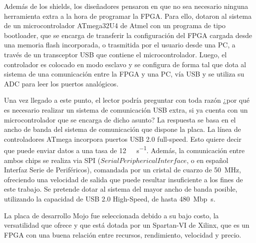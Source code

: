 Además de los shields, los diseñadores pensaron en que no sea necesario ninguna herramienta extra a la hora de programar la FPGA. Para ello, dotaron al sistema de un microcontrolador ATmega32U4 de Atmel con un programa de tipo bootloader, que se encarga de transferir la configuración del FPGA cargada desde una memoria flash incorporada, o trasmitida por el usuario desde una PC, a través de un transceptor USB que contiene el microcontrolador. Luego, el controlador es colocado en modo esclavo y se configura de forma tal que dota al sistema de una comunicación entre la FPGA y una PC, vía USB y se utiliza su ADC para leer los puertos analógicos.%

Una vez llegado a este punto, el lector podría preguntar con toda razón ¿por qué es necesario realizar un sistema de comunicación USB extra, si ya cuenta con un microcontrolador que se encarga de dicho asunto? La respuesta se basa en el ancho de banda del sistema de comunicación que dispone la placa. La línea de controladores ATmega incorpora puertos USB 2.0 full-speed. Esto quiere decir que puede enviar datos a una tasa de \SI{12}{\mega\bit\per\second}. Además, la comunicación entre ambos chips se realiza via SPI (\(Serial Peripherical Interface\), o en español Interfaz Serie de Periféricos), comandada por un cristal de cuarzo de \SI{50}{\mega\hertz}, ofreciendo una velocidad de salida que puede resultar insuficiente a los fines de este trabajo. Se pretende dotar al sistema del mayor ancho de banda posible, utilizando la capacidad de USB 2.0 High-Speed, de hasta \SI{480}{\mega bp\second}.%

La placa de desarrollo Mojo fue seleccionada debido a su bajo costo, la versatilidad que ofrece y que está dotada por un Spartan-VI de Xilinx, que es un FPGA con una buena relación entre recursos, rendimiento, velocidad y precio.%
